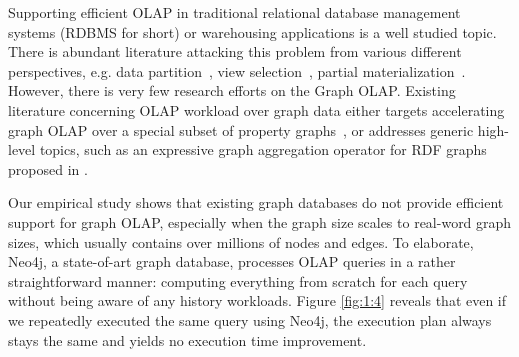 Supporting efficient OLAP in traditional relational database management systems (RDBMS for short) \cite{LingOzsu09} or warehousing applications is a well studied topic. There is abundant literature attacking this problem from various different perspectives, e.g. data partition~\cite{DBLP:conf/ismis/CuzzocreaL12}, view selection~\cite{DBLP:conf/dawak/LawrenceR06}, partial materialization~\cite{DBLP:journals/kais/DrzadzewskiT16}. However, there is very few research efforts on the Graph OLAP. Existing literature concerning OLAP workload over graph data either targets accelerating graph OLAP over a special subset of property graphs~\cite{sigmod11_ZhaoLXH11}, or addresses generic high-level topics, such as an expressive graph aggregation operator for RDF graphs proposed in \cite{iswc15_Maali:2015aa}. 


Our empirical study shows that existing graph databases do not provide efficient support for graph OLAP, especially when the graph size scales to real-word graph sizes, which usually contains over millions of nodes and edges. %
To elaborate, Neo4j, a state-of-art graph database, processes OLAP queries in a rather straightforward manner: computing everything from scratch for each query without being aware of any history workloads. Figure \ref{fig:1:4} reveals that even if we repeatedly executed the same query using Neo4j, the execution plan always stays the same and yields no execution time improvement.

